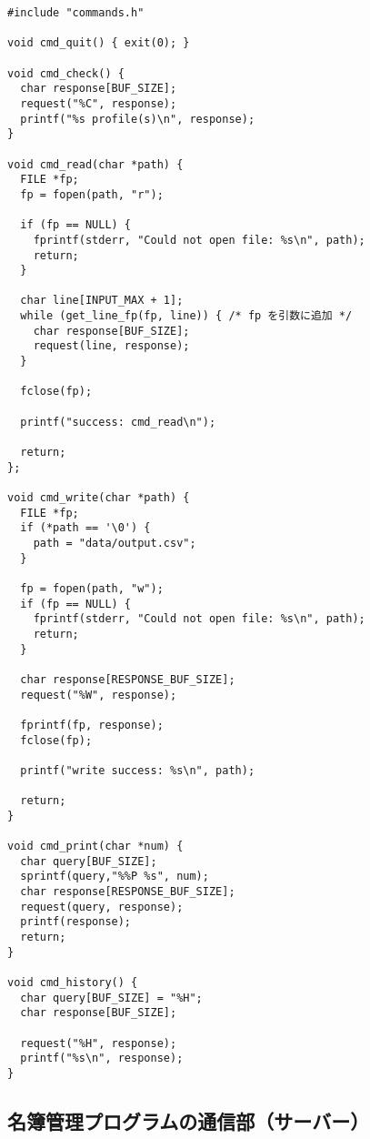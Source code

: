 \documentclass[11pt]{jsarticle}
\begin{document}
\begin{verbatim}
#include "commands.h"

void cmd_quit() { exit(0); }

void cmd_check() {
  char response[BUF_SIZE];
  request("%C", response);
  printf("%s profile(s)\n", response);
}

void cmd_read(char *path) {
  FILE *fp;
  fp = fopen(path, "r");

  if (fp == NULL) {
    fprintf(stderr, "Could not open file: %s\n", path);
    return;
  }

  char line[INPUT_MAX + 1];
  while (get_line_fp(fp, line)) { /* fp を引数に追加 */
    char response[BUF_SIZE];
    request(line, response);
  }

  fclose(fp);

  printf("success: cmd_read\n");

  return;
};

void cmd_write(char *path) {
  FILE *fp;
  if (*path == '\0') {
    path = "data/output.csv";
  }

  fp = fopen(path, "w");
  if (fp == NULL) {
    fprintf(stderr, "Could not open file: %s\n", path);
    return;
  }
    
  char response[RESPONSE_BUF_SIZE];
  request("%W", response);

  fprintf(fp, response);
  fclose(fp);

  printf("write success: %s\n", path);

  return;
}

void cmd_print(char *num) {
  char query[BUF_SIZE];
  sprintf(query,"%%P %s", num);
  char response[RESPONSE_BUF_SIZE];
  request(query, response);
  printf(response);
  return;
}

void cmd_history() {
  char query[BUF_SIZE] = "%H";
  char response[BUF_SIZE];
  
  request("%H", response);
  printf("%s\n", response);
}
\end{verbatim}

\subsection{名簿管理プログラムの通信部（サーバー）} \label{sec:server.c}
\end{document}
